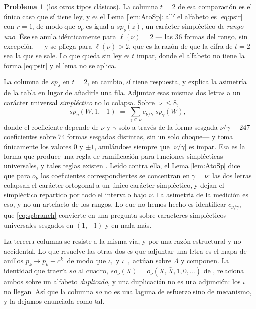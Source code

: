 \documentclass[11pt,reqno]{amsart}
\theoremstyle{plain}
\theoremstyle{definition}
\newtheorem{problem}[theorem]{Problema}
\begin{document}
\begin{problem}[los otros tipos clásicos]
La columna $t=2$ de esa comparación es el único caso que sí tiene ley, y es el Lema
\ref{lem:AtoSp}: allí el alfabeto es \eqref{eq:psir} con $r=1$, de modo que $o_\nu$ es igual a
$sp_\nu(z)$, un carácter simpléctico de \emph{rango uno}. Ése se anula idénticamente para
$\ell(\nu)=2$ --- las $36$ formas del rango, sin excepción --- y se pliega para $\ell(\nu)>2$, que es
la razón de que la cifra de $t=2$ sea la que se sale. Lo que queda sin ley es $t$ impar, donde el
alfabeto no tiene la forma \eqref{eq:psir} y el lema no se aplica.

La columna de $sp_\lambda$ en $t=2$, en cambio, sí tiene respuesta, y explica la asimetría de la
tabla en lugar de añadirle una fila. Adjuntar esas mismas dos letras a un carácter universal
\emph{simpléctico} no lo colapsa. Sobre $|\nu|\le8$,
\begin{equation}\label{eq:spbranch}
sp_\nu(W,1,-1)\;=\;\sum_{\gamma\subseteq\nu}c_{\nu/\gamma}\;sp_\gamma(W),
\end{equation}
donde el coeficiente depende de $\nu$ y $\gamma$ solo a través de la forma sesgada $\nu/\gamma$
---$247$ coeficientes sobre $74$ formas sesgadas distintas, sin un solo choque--- y toma únicamente
los valores $0$ y $\pm1$, anulándose siempre que $|\nu/\gamma|$ es impar. Esa es la forma que produce
una regla de ramificación para funciones simplécticas universales, y tales reglas existen
\cite{JJLW24}. Leído contra ella, el Lema \ref{lem:AtoSp} dice que para $o_\nu$ los coeficientes
correspondientes se concentran en $\gamma=\nu$: las dos letras colapsan el carácter ortogonal a un
único carácter simpléctico, y dejan el simpléctico repartido por todo el intervalo bajo $\nu$. La
asimetría de la medición es eso, y no un artefacto de los rangos. Lo que no hemos hecho es
identificar $c_{\nu/\gamma}$, que \eqref{eq:spbranch} convierte en una pregunta sobre caracteres
simplécticos universales sesgados en $(1,-1)$ y en nada más.

La tercera columna se resiste a la misma vía, y por una razón estructural y no accidental. Lo que
resuelve las otras dos es que adjuntar una letra es el mapa de anillos $p_k\mapsto p_k+c^k$, de modo
que $\iota_{1}$ y $\iota_{-1}$ actúan sobre $\Lambda$ y componen. La identidad que traería $so$ al
cuadro, $so_\nu(X)=o_\nu(X,\bar X,1,0,\dots)$ de \cite[(2.13)]{AK25}, relaciona ambos sobre un
alfabeto \emph{duplicado}, y una duplicación no es una adjunción: los $\iota$ no llegan. Así que la
columna $so$ no es una laguna de esfuerzo sino de mecanismo, y la dejamos enunciada como tal.
\end{problem}
\end{document}
